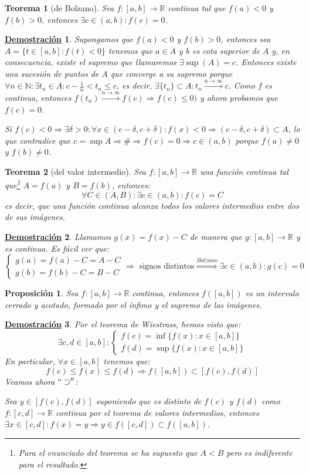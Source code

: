 \documentclass[10pt,a4paper,openright]{book}
\theoremstyle{break}
\newtheorem{theo}{Teorema}[chapter]
\newtheorem{prop}{Proposición}[chapter]
\newtheorem*{demo}{\underline{Demostración}}
\begin{document}
\begin{theo}[de Bolzano]
Sea $f:[a,b] \rightarrow \mathbb R$ continua tal que $f(a)<0$ y $f(b)>0$, entonces $\exists c\in (a,b): f(c)=0$.
\end{theo}
\begin{demo}
Supongamos que $f(a)<0$ y $f(b)>0$, entonces sea $A=\{t\in [a,b]: f(t)<0\}$ tenemos que $a\in A$ y $b$ es cota superior de $A$ y, en consecuencia, existe el supremo que llamaremos $\exists \sup(A)=c$. Entonces existe una sucesión de puntos de $A$ que converge a su supremo porque $\forall n\in \mathbb N: \exists t_n\in A: c-\frac{1}{n}< t_n\leq c$, es decir, $\exists\{t_n\}\subset A: t_n\xrightarrow{n\rightarrow \infty}c$. Como $f$ es continua, entonces $f(t_n)\xrightarrow{n\rightarrow \infty}f(c)\Rightarrow f(c)\leq 0)$ y ahora probamos que $f(c)=0$.\par
Si $f(c)<0\Rightarrow \exists\delta>0: \forall x\in (c-\delta, c+\delta): f(x)<0\Rightarrow (c-\delta, c+\delta)\subset A$, lo que contradice que $c=\sup A\Rightarrow \#\Rightarrow f(c)=0\Rightarrow c\in (a,b)$ porque $f(a)\neq 0$ y $f(b)\neq 0$.
\end{demo}

\begin{theo}[del valor intermedio]
Sea $f:[a,b] \rightarrow \mathbb R$ una función continua tal que\footnote{Para el enunciado del teorema se ha supuesto que $A < B$ pero es indiferente para el resultado.} $A=f(a)$ y $B=f(b)$, entonces:
$$\forall C \in (A,B) : \exists c \in (a,b) : f(c) = C$$
es decir, que una función continua alcanza todos los valores intermedios entre dos de sus imágenes.
\end{theo}
\begin{demo}
Llamamos $g(x)=f(x)-C$ de manera que $g:[a,b] \rightarrow \mathbb R$ y es continua. Es fácil ver que:
$$\begin{cases}g(a)=f(a)-C=A-C \\ 
g(b)=f(b)-C=B-C \end{cases} \Rightarrow \mbox{ signos distintos}\stackrel{Bolzano}{\Rightarrow} \exists c\in (a,b): g(c)=0$$
\end{demo}

\begin{prop}
Sea $f:[a,b] \rightarrow \mathbb R$ continua, entonces $f([a,b])$ es un intervalo cerrado y acotado, formado por el ínfimo y el supremo de las imágenes.
\end{prop}
\begin{demo}
Por el teorema de Wiestrass, hemos visto que:
$$\exists c,d\in [a,b]:\begin{cases}f(c)=\inf\{f(x): x\in [a,b]\} \\ f(d)=\sup \{f(x):x\in [a,b]\} \end{cases}$$
En particular, $\forall x\in [a,b]$ tenemos que:
$$f(c)\leq f(x)\leq f(d)\Rightarrow f([a,b])\subset [f(c), f(d)]$$
Veamos ahora $``\supset''$:\par
Sea $y\in [f(c), f(d)]$ suponiendo que es distinto de $f(c)$ y $f(d)$ como $f:[c,d]\rightarrow \mathbb R$ continua por el teorema de valores intermedios, entonces $\exists x\in [c,d]: f(x)=y\Rightarrow y\in f([c,d])\subset f([a,b])$.
\end{demo}
\end{document}
